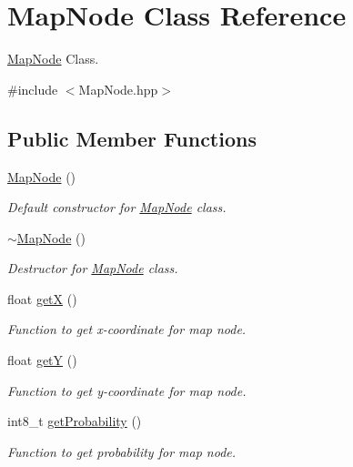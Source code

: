 \hypertarget{classMapNode}{}\section{Map\+Node Class Reference}
\label{classMapNode}


\hyperlink{classMapNode}{Map\+Node} Class.  




{\ttfamily \#include $<$Map\+Node.\+hpp$>$}

\subsection*{Public Member Functions}
\begin{DoxyCompactItemize}
\item 
\hyperlink{classMapNode_aa4e1fb66b032e08781093ffb7fe03885}{Map\+Node} ()
\begin{DoxyCompactList}\small\item\em Default constructor for \hyperlink{classMapNode}{Map\+Node} class. \end{DoxyCompactList}\item 
\hyperlink{classMapNode_a380098b662362882a2d5ca3bd5004fc1}{$\sim$\+Map\+Node} ()
\begin{DoxyCompactList}\small\item\em Destructor for \hyperlink{classMapNode}{Map\+Node} class. \end{DoxyCompactList}\item 
float \hyperlink{classMapNode_a2049f6ba89f765acde265d0f381a0e2c}{getX} ()
\begin{DoxyCompactList}\small\item\em Function to get x-\/coordinate for map node. \end{DoxyCompactList}\item 
float \hyperlink{classMapNode_a05b7f28bfdbb7ae2def6a710a3c68b13}{getY} ()
\begin{DoxyCompactList}\small\item\em Function to get y-\/coordinate for map node. \end{DoxyCompactList}\item 
int8\+\_\+t \hyperlink{classMapNode_a429349451143f622dce0fdcc77b8cbb8}{get\+Probability} ()
\begin{DoxyCompactList}\small\item\em Function to get probability for map node. \end{DoxyCompactList}\item 

\end{DoxyCompactItemize}
